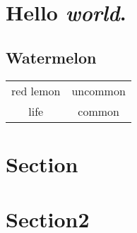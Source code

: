 \documentclass[11pt, a4paper, twoside,parskip=full, openright]{scrreprt}
\begin{document}
	
	
    \section{Hello \textit{world}.}
    \subsection{Watermelon}
    \begin{tabular}{c c}
        red lemon & uncommon \\ \n
        life & common
    \end{tabular}
    \section{Section}
    \section{Section2}
\end{document}
